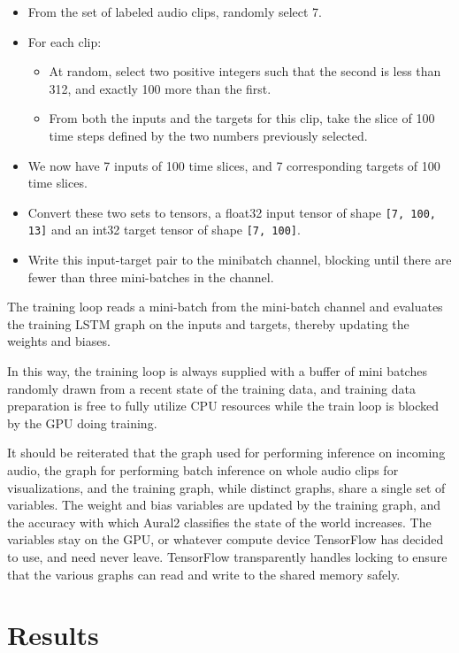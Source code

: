 \documentclass[conference]{IEEEtran}
\begin{document}
\begin{itemize}
\item From the set of labeled audio clips, randomly select 7.
\item For each clip:
\begin{itemize}
  \item At random, select two positive integers such that the second is less than 312, and exactly 100 more than the first.
  \item From both the inputs and the targets for this clip, take the slice of 100 time steps defined by the two numbers previously selected.
\end{itemize}
\item We now have 7 inputs of 100 time slices, and 7 corresponding targets of 100 time slices.
\item Convert these two sets to tensors, a float32 input tensor of shape \texttt{[7, 100, 13]} and an int32 target tensor of shape \texttt{[7, 100]}.
\item Write this input-target pair to the minibatch channel, blocking until there are fewer than three mini-batches in the channel.
\end{itemize}

The training loop reads a mini-batch from the mini-batch channel and
evaluates the training LSTM graph on the inputs and targets, thereby
updating the weights and biases.

In this way, the training loop is always supplied with a buffer of mini
batches randomly drawn from a recent state of the training data, and
training data preparation is free to fully utilize CPU resources while the train
loop is blocked by the GPU doing training.

It should be reiterated that the graph used for performing inference on
incoming audio, the graph for performing batch inference on whole audio
clips for visualizations, and the training graph, while distinct graphs,
share a single set of variables. The weight and bias variables are
updated by the training graph, and the accuracy with which Aural2
classifies the state of the world increases. The variables stay on the
GPU, or whatever compute device TensorFlow has decided to use, and need
never leave. TensorFlow transparently handles locking to ensure that the
various graphs can read and write to the shared memory safely.

\section{Results}
\end{document}
